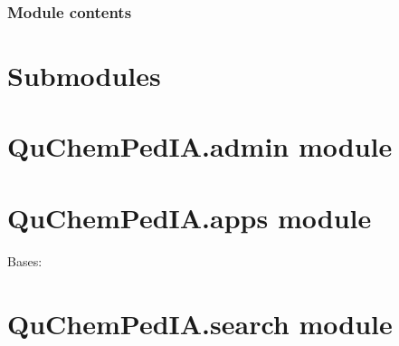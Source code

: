 \documentclass[letterpaper,10pt,english]{sphinxmanual}
\begin{document}
\subsection{Module contents}
\label{\detokenize{QuChemPedIA.views:module-QuChemPedIA.views}}\label{\detokenize{QuChemPedIA.views:module-contents}}

\chapter{Submodules}
\label{\detokenize{QuChemPedIA:submodules}}

\chapter{QuChemPedIA.admin module}
\label{\detokenize{QuChemPedIA:module-QuChemPedIA.admin}}\label{\detokenize{QuChemPedIA:quchempedia-admin-module}}

\chapter{QuChemPedIA.apps module}
\label{\detokenize{QuChemPedIA:module-QuChemPedIA.apps}}\label{\detokenize{QuChemPedIA:quchempedia-apps-module}}

\begin{fulllineitems}
\label{\detokenize{QuChemPedIA:QuChemPedIA.apps.QuchempediaConfig}}
Bases: 

\begin{fulllineitems}
\label{\detokenize{QuChemPedIA:QuChemPedIA.apps.QuchempediaConfig.name}}
\end{fulllineitems}


\end{fulllineitems}



\chapter{QuChemPedIA.search module}
\label{\detokenize{QuChemPedIA:module-QuChemPedIA.search}}\label{\detokenize{QuChemPedIA:quchempedia-search-module}}
\end{document}
